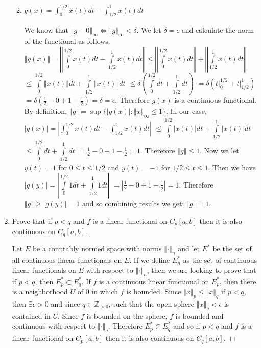 \documentclass[12pt,letterpaper,reqno]{amsart}
\newcommand{\Z}{\mathbb Z}
\newcommand{\Norm}[1]{\left\Vert #1 \right \Vert}
\begin{document}
\begin{enumerate}[1.]
\begin{enumerate}
\begin{flushleft}
\end{flushleft}
\item $g(x)=\int_0^{1/2}x(t)dt - \int_{1/2}^1 x(t)dt$
\begin{flushleft}
We know that $\Norm{g - 0}_\infty \Leftrightarrow \Norm{g}_\infty < \delta$. We let $\delta = \epsilon$ and calculate the norm of the functional as follows. $\Norm{g(x)} = \Norm{\int\limits_0^{1/2}x(t)dt - \int\limits^1_{1/2}x(t)dt} \leq \Norm{\int\limits_0^{1/2}x(t)dt} + \Norm{\int\limits^1_{1/2}x(t)dt}$ $\leq \int\limits_0^{1/2}\Norm{x(t)}dt + \int\limits^1_{1/2}\Norm{x(t)}dt$ $\leq \delta(\int\limits_0^{1/2}dt + \int\limits_{1/2}^1 dt)$ $=\delta( t\Big|_0^{1/2} + t\Big|_{1/2}^1 )$ $= \delta(\frac{1}{2} - 0 + 1 - \frac{1}{2}) = \delta = \epsilon$. Therefore $g(x)$ is a continuous functional. By definition, $\Norm{g} = \sup\{|g(x)| : \Norm{x}_\infty \leq 1\}$. In our case, $|g(x)| = |\int_0^{1/2}x(t)dt - \int_{1/2}^1 x(t)dt|$ $\leq \int\limits_0^{1/2}|x(t)|dt + \int\limits_{1/2}^1|x(t)|dt$ $\leq \int\limits_0^{1/2}dt + \int\limits_{1/2}^1 dt$ $= \frac{1}{2} - 0 + 1 - \frac{1}{2} = 1$. Therefore $\Norm{g} \leq 1$. Now we let $y(t) = 1$ for $0 \leq t \leq 1/2$ and $y(t) = -1$ for $1/2 \leq t \leq 1$. Then we have $|g(y)| = |\int\limits_0^{1/2}1 dt + \int\limits_{1/2}^1 1 dt|$ $= |\frac{1}{2} - 0 + 1 - \frac{1}{2}| = 1$. Therefore $\Norm{g} \geq |g(y)| = 1$ and so combining results we get: $\Norm{g} = 1$. 
\end{flushleft}
\end{enumerate}
\item Prove that if $p<q$ and $f$ is a linear functional on $C_p[a,b]$ then it is also continuous on $C_q[a,b]$.
\begin{flushleft}
Let $E$ be a countably normed space with norms $\Norm{\cdot}_n$ and let $E^*$ be the set of all continuous linear functionals on $E$. If we define $E_n^*$ as the set of continuous linear functionals on $E$ with respect to $\Norm{\cdot}_n$, then we are looking to prove that if $p<q$, then $E_p^* \subset E_q^*$. If $f$ is a continuous linear functional on $E_p^*$, then there is a neighborhood $U$ of $0$ in which $f$ is bounded. Since $\Norm{x}_p \leq \Norm{x}_q$ if $p<q$, then $\exists \epsilon > 0$ and since $q \in \Z_{>0}$, such that the open sphere $\Norm{x}_q < \epsilon$ is contained in $U$. Since $f$ is bounded on the sphere, $f$ is bounded and continuous with respect to $\Norm{\cdot}_q$. Therefore $E_p^* \subset E_q^*$ and so if $p<q$ and $f$ is a linear functional on $C_p[a,b]$ then it is also continuous on $C_q[a,b]$. $\Box$
\end{flushleft}

\end{enumerate}
\end{document}
